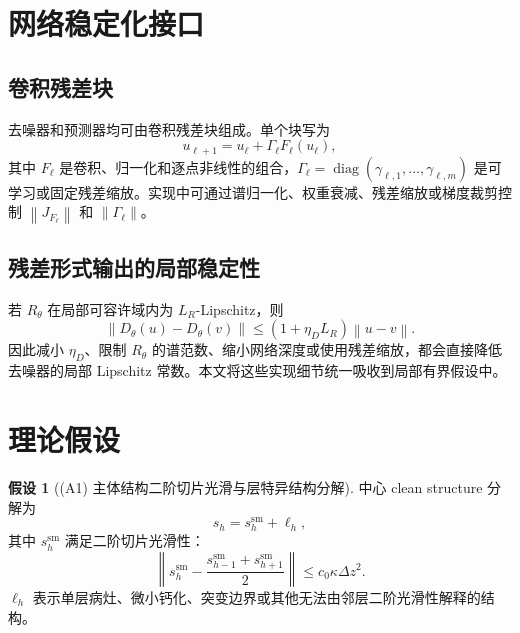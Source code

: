 \documentclass[11pt,a4paper,UTF8,fontset=fandol]{ctexart}
\theoremstyle{definition}
\newtheorem{assumption}[theorem]{假设}
\DeclareMathOperator{\diag}{diag}
\newcommand{\norm}[1]{\left\lVert#1\right\rVert}
\begin{document}
\section{网络稳定化接口}

\subsection{卷积残差块}

去噪器和预测器均可由卷积残差块组成。单个块写为
\begin{equation}
\label{eq:conv-residual-block}
    u_{\ell+1}=u_\ell+\Gamma_\ell F_\ell(u_\ell),
\end{equation}
其中 $F_\ell$ 是卷积、归一化和逐点非线性的组合，$\Gamma_\ell=\diag(\gamma_{\ell,1},\ldots,\gamma_{\ell,m})$ 是可学习或固定残差缩放。实现中可通过谱归一化、权重衰减、残差缩放或梯度裁剪控制 $\norm{J_{F_\ell}}$ 和 $\norm{\Gamma_\ell}$。

\subsection{残差形式输出的局部稳定性}

若 $R_\theta$ 在局部可容许域内为 $L_R$-Lipschitz，则
\begin{equation}
    \norm{D_\theta(u)-D_\theta(v)}
    \le (1+\eta_D L_R)\norm{u-v}.
\end{equation}
因此减小 $\eta_D$、限制 $R_\theta$ 的谱范数、缩小网络深度或使用残差缩放，都会直接降低去噪器的局部 Lipschitz 常数。本文将这些实现细节统一吸收到局部有界假设中。

\section{理论假设}
\label{sec:assumptions}

\begin{assumption}[(A1) 主体结构二阶切片光滑与层特异结构分解]
中心 clean structure 分解为
\begin{equation}
    s_h=s_h^{\mathrm{sm}}+\ell_h,
\end{equation}
其中 $s_h^{\mathrm{sm}}$ 满足二阶切片光滑性：
\begin{equation}
\label{eq:slice-smooth}
    \left\|s_h^{\mathrm{sm}}-
    \frac{s_{h-1}^{\mathrm{sm}}+s_{h+1}^{\mathrm{sm}}}{2}
    \right\|
    \le c_0\kappa\Delta z^2.
\end{equation}
$\ell_h$ 表示单层病灶、微小钙化、突变边界或其他无法由邻层二阶光滑性解释的结构。
\end{assumption}
\end{document}
